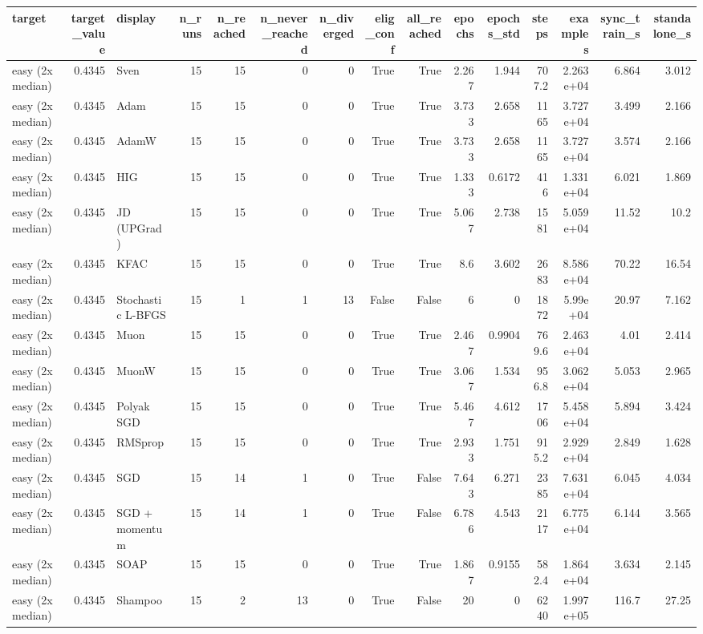 \begin{tabular}{lrlrrrrrrrrrrrr}
\toprule
target & target\_value & display & n\_runs & n\_reached & n\_never\_reached & n\_diverged & elig\_conf & all\_reached & epochs & epochs\_std & steps & examples & sync\_train\_s & standalone\_s \\
\midrule
easy (2x median) & 0.4345 & Sven & 15 & 15 & 0 & 0 & True & True & 2.267 & 1.944 & 707.2 & 2.263e+04 & 6.864 & 3.012 \\
easy (2x median) & 0.4345 & Adam & 15 & 15 & 0 & 0 & True & True & 3.733 & 2.658 & 1165 & 3.727e+04 & 3.499 & 2.166 \\
easy (2x median) & 0.4345 & AdamW & 15 & 15 & 0 & 0 & True & True & 3.733 & 2.658 & 1165 & 3.727e+04 & 3.574 & 2.166 \\
easy (2x median) & 0.4345 & HIG & 15 & 15 & 0 & 0 & True & True & 1.333 & 0.6172 & 416 & 1.331e+04 & 6.021 & 1.869 \\
easy (2x median) & 0.4345 & JD (UPGrad) & 15 & 15 & 0 & 0 & True & True & 5.067 & 2.738 & 1581 & 5.059e+04 & 11.52 & 10.2 \\
easy (2x median) & 0.4345 & KFAC & 15 & 15 & 0 & 0 & True & True & 8.6 & 3.602 & 2683 & 8.586e+04 & 70.22 & 16.54 \\
easy (2x median) & 0.4345 & Stochastic L-BFGS & 15 & 1 & 1 & 13 & False & False & 6 & 0 & 1872 & 5.99e+04 & 20.97 & 7.162 \\
easy (2x median) & 0.4345 & Muon & 15 & 15 & 0 & 0 & True & True & 2.467 & 0.9904 & 769.6 & 2.463e+04 & 4.01 & 2.414 \\
easy (2x median) & 0.4345 & MuonW & 15 & 15 & 0 & 0 & True & True & 3.067 & 1.534 & 956.8 & 3.062e+04 & 5.053 & 2.965 \\
easy (2x median) & 0.4345 & Polyak SGD & 15 & 15 & 0 & 0 & True & True & 5.467 & 4.612 & 1706 & 5.458e+04 & 5.894 & 3.424 \\
easy (2x median) & 0.4345 & RMSprop & 15 & 15 & 0 & 0 & True & True & 2.933 & 1.751 & 915.2 & 2.929e+04 & 2.849 & 1.628 \\
easy (2x median) & 0.4345 & SGD & 15 & 14 & 1 & 0 & True & False & 7.643 & 6.271 & 2385 & 7.631e+04 & 6.045 & 4.034 \\
easy (2x median) & 0.4345 & SGD + momentum & 15 & 14 & 1 & 0 & True & False & 6.786 & 4.543 & 2117 & 6.775e+04 & 6.144 & 3.565 \\
easy (2x median) & 0.4345 & SOAP & 15 & 15 & 0 & 0 & True & True & 1.867 & 0.9155 & 582.4 & 1.864e+04 & 3.634 & 2.145 \\
easy (2x median) & 0.4345 & Shampoo & 15 & 2 & 13 & 0 & True & False & 20 & 0 & 6240 & 1.997e+05 & 116.7 & 27.25 \\

\end{tabular}
